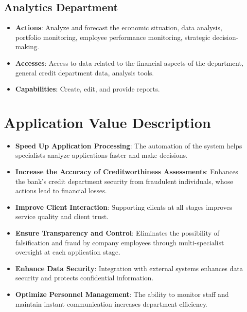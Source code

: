\documentclass[20pt]{article}
\begin{document}
\subsection{Analytics Department}
\begin{itemize}
    \item \textbf{Actions}: Analyze and forecast the economic situation, data analysis, portfolio monitoring, employee performance monitoring, strategic decision-making.
    \item \textbf{Accesses}: Access to data related to the financial aspects of the department, general credit department data, analysis tools.
    \item \textbf{Capabilities}: Create, edit, and provide reports.
\end{itemize}

\section{Application Value Description}

\begin{itemize}
    \item \textbf{Speed Up Application Processing}: The automation of the system helps specialists analyze applications faster and make decisions.
    \item \textbf{Increase the Accuracy of Creditworthiness Assessments}: Enhances the bank's credit department security from fraudulent individuals, whose actions lead to financial losses.
    \item \textbf{Improve Client Interaction}: Supporting clients at all stages improves service quality and client trust.
    \item \textbf{Ensure Transparency and Control}: Eliminates the possibility of falsification and fraud by company employees through multi-specialist oversight at each application stage.
    \item \textbf{Enhance Data Security}: Integration with external systems enhances data security and protects confidential information.
    \item \textbf{Optimize Personnel Management}: The ability to monitor staff and maintain instant communication increases department efficiency.
\end{itemize}


\end{document}
